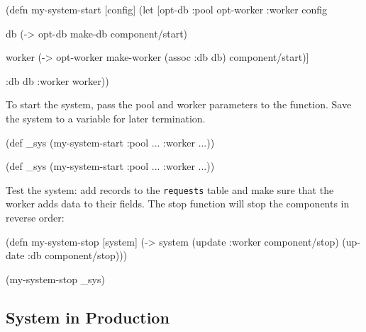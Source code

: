 \begin{english}
  \begin{clojure/lines}
(defn my-system-start
  [config]
  (let [{opt-db :pool
         opt-worker :worker} config

        db (-> opt-db
               make-db
               component/start)

        worker (-> opt-worker
                   make-worker
                   (assoc :db db)
                   component/start)]

    {:db db :worker worker}))
  \end{clojure/lines}
\end{english}

To start the system, pass the pool and worker parameters to the function. Save the system to a variable for later termination.

\ifnarrow

\begin{english}
  \begin{clojure}
(def _sys
  (my-system-start
    {:pool {...} :worker {...}}))
  \end{clojure}
\end{english}

\else

\begin{english}
  \begin{clojure}
(def _sys (my-system-start {:pool {...} :worker {...}}))
  \end{clojure}
\end{english}

\fi

Test the system: add records to the \verb|requests| table and make sure that the worker adds data to their fields. The stop function will stop the components in reverse order:

\begin{english}
  \begin{clojure}
(defn my-system-stop
  [system]
  (-> system
      (update :worker component/stop)
      (update :db component/stop)))

(my-system-stop _sys)
  \end{clojure}
\end{english}

\subsection{System in Production}


